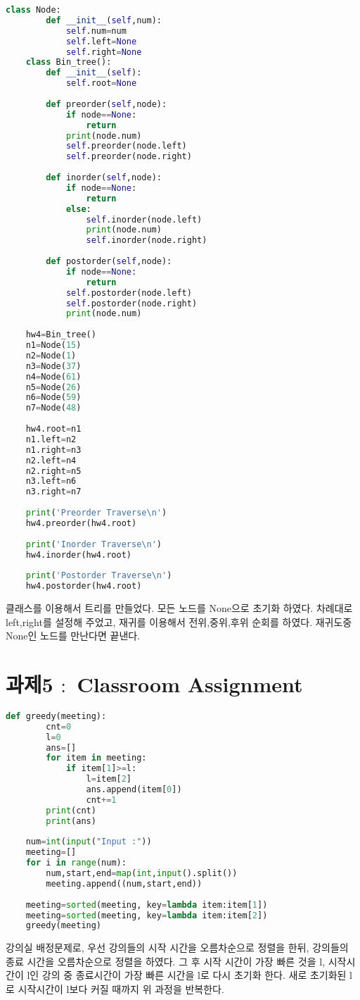 \documentclass[letterpaper, 10 pt, conference]{ieeeconf}
\begin{document}
\begin{lstlisting}[language=python]
      class Node:
        def __init__(self,num):
            self.num=num
            self.left=None
            self.right=None
    class Bin_tree():
        def __init__(self):
            self.root=None
    
        def preorder(self,node):
            if node==None:
                return
            print(node.num)
            self.preorder(node.left)
            self.preorder(node.right)
    
        def inorder(self,node):
            if node==None:
                return
            else:
                self.inorder(node.left)
                print(node.num)
                self.inorder(node.right)
    
        def postorder(self,node):
            if node==None:
                return
            self.postorder(node.left)
            self.postorder(node.right)
            print(node.num)
    
    hw4=Bin_tree()
    n1=Node(15)
    n2=Node(1)
    n3=Node(37)
    n4=Node(61)
    n5=Node(26)
    n6=Node(59)
    n7=Node(48)
    
    hw4.root=n1
    n1.left=n2
    n1.right=n3
    n2.left=n4
    n2.right=n5
    n3.left=n6
    n3.right=n7
    
    print('Preorder Traverse\n')
    hw4.preorder(hw4.root)
    
    print('Inorder Traverse\n')
    hw4.inorder(hw4.root)
    
    print('Postorder Traverse\n')
    hw4.postorder(hw4.root)
\end{lstlisting}
\small 클래스를 이용해서 트리를 만들었다. 모든 노드를 None으로 초기화 하였다. 차례대로 left,right를 설정해 주었고, 재귀를 이용해서 전위,중위,후위 순회를 하였다. 재귀도중 None인 노드를 만난다면 끝낸다.

\section{과제5 $:$ Classroom Assignment}

\begin{lstlisting}[language=python]
    def greedy(meeting):
        cnt=0
        l=0
        ans=[]
        for item in meeting:
            if item[1]>=l:
                l=item[2]
                ans.append(item[0])
                cnt+=1
        print(cnt)
        print(ans)
    
    num=int(input("Input :"))
    meeting=[]
    for i in range(num):
        num,start,end=map(int,input().split())
        meeting.append((num,start,end))
    
    meeting=sorted(meeting, key=lambda item:item[1])
    meeting=sorted(meeting, key=lambda item:item[2])
    greedy(meeting)
\end{lstlisting}
\small 강의실 배정문제로, 우선 강의들의 시작 시간을 오름차순으로 정렬을 한뒤, 강의들의 종료 시간을 오름차순으로 정렬을 하였다. 그 후 시작 시간이 가장 빠른 것을 l, 시작시간이 l인 강의 중 종료시간이 가장 빠른 시간을 l로 다시 초기화 한다. 새로 초기화된 l로 시작시간이 l보다 커질 때까지 위 과정을 반복한다.
\end{document}
